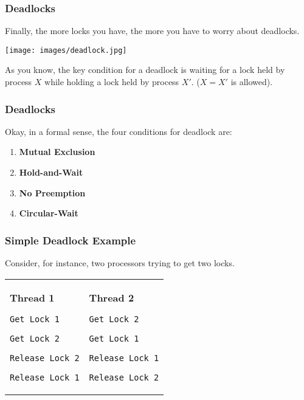\begin{frame}
\frametitle{Deadlocks}

Finally, the more locks you have, the more you have to worry about deadlocks.

\begin{center}
	\texttt{[image: images/deadlock.jpg]}
\end{center}

As you know, the key condition for a deadlock is waiting for a lock held by process $X$ while holding a lock held by process $X'$. ($X = X'$ is allowed).

\end{frame}


\begin{frame}
\frametitle{Deadlocks}



Okay, in a formal sense, the four conditions for deadlock are:

\begin{enumerate}
	\item \textbf{Mutual Exclusion}
	\item \textbf{Hold-and-Wait}
	\item \textbf{No Preemption}
	\item \textbf{Circular-Wait}
\end{enumerate}

\end{frame}


\begin{frame}[fragile]
\frametitle{Simple Deadlock Example}

Consider, for instance, two processors trying to get two locks.

\begin{center}
  \begin{tabular}{ll}
\begin{minipage}{.4\textwidth}
      {\bf Thread 1}

      \verb+Get Lock 1+

      \verb+Get Lock 2+

      \verb+Release Lock 2+

      \verb+Release Lock 1+
\end{minipage} & 
\begin{minipage}{.4\textwidth}
      {\bf Thread 2}

      \verb+Get Lock 2+

      \verb+Get Lock 1+

      \verb+Release Lock 1+

      \verb+Release Lock 2+
\end{minipage}
\end{tabular}
\end{center}


\end{frame}

